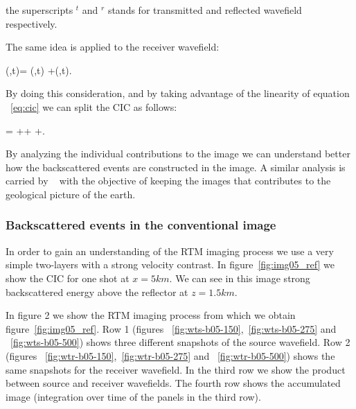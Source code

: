 the superscripts $^t$ and $^r$ stands for transmitted and reflected wavefield respectively. 

The same idea is applied to the receiver wavefield:

\beq
\UR(\xx,t)= \URr(\xx,t) +\URt(\xx,t).
\label{eq:rsplit}
\eeq

By doing this consideration, and by taking advantage of the linearity of equation ~\ref{eq:cic}  we
can split the CIC as follows:

\beq
\R= ++  +.
\label{eq:cicsplit}
\eeq

By analyzing the individual contributions to the image we can understand better how the backscattered events
are constructed in the image. A similar analysis is carried by ~\citep{fei:3130,liu:S29} with the objective
of keeping the images that contributes to the geological picture of the earth.

\subsubsection{Backscattered events in the conventional image}

In order to gain an understanding of the RTM imaging process we use a very simple two-layers with a strong velocity
contrast. In figure~\ref{fig:img05_ref} we show the CIC for one shot at $x=5km$. We can see in this image strong 
backscattered energy above the reflector at $z=1.5km$.

In figure 2 we show the RTM imaging process from which we obtain figure~\ref{fig:img05_ref}. Row 1 
(figures ~\ref{fig:wts-b05-150},~\ref{fig:wts-b05-275} and ~\ref{fig:wts-b05-500}) shows three different snapshots
of the source wavefield. Row 2 (figures ~\ref{fig:wtr-b05-150},~\ref{fig:wtr-b05-275} and ~\ref{fig:wtr-b05-500}) 
shows the same snapshots for the receiver wavefield. In the third row we show the product between
source and receiver wavefields. The fourth row shows the accumulated image (integration over time of the panels
in the third row).


